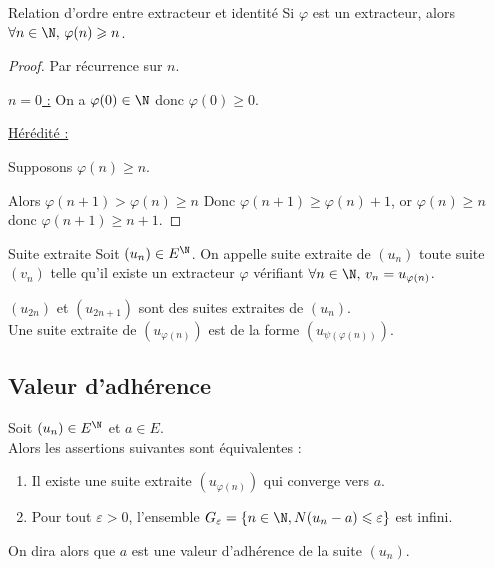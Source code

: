 \begin{proposition}{Relation d'ordre entre extracteur et identité}{}
    Si $\varphi$ est un extracteur, alors $\forall n \in \N, \, \varphi(n) \geqslant n$.
\end{proposition}


\begin{proof}
    Par récurrence sur $n$. 

    \uline{$n = 0$ :}
    On a $\varphi(0) \in \N$ donc $\varphi(0) \geqslant 0$.

    \uline{Hérédité :}

    Supposons $\varphi(n) \geqslant n$.

    Alors $\varphi(n + 1) > \varphi(n) \geqslant n$ 
    Donc $\varphi(n + 1) \geqslant \varphi(n) + 1$, or $\varphi(n) \geqslant n$ donc
    $\varphi(n + 1) \geqslant n + 1$.
\end{proof}

\begin{definition}{Suite extraite}{}
    Soit $(u_n) \in E^{\N}$. On appelle suite extraite de $(u_n)$ toute suite 
    $(v_n)$ telle qu'il existe un extracteur $\varphi$ vérifiant 
    $\forall n \in \N, \, v_n = u_{\varphi(n)}$.
\end{definition}

\begin{exemple}
    $(u_{2n})$ et $(u_{2n + 1})$ sont des suites extraites de $(u_n)$. \\

    Une suite extraite de $(u_{\varphi(n)})$ est de la forme $(u_{\psi (\varphi (n))})$.
\end{exemple}

\subsection{Valeur d'adhérence}

\begin{theoreme}{}{}
    Soit $(u_n) \in E^{\N}$ et $a \in E$. \\

    Alors les assertions suivantes sont équivalentes :
    \begin{enumerate}
        \item Il existe une suite extraite $(u_{\varphi(n)})$ qui converge 
            vers $a$.
        \item Pour tout $\varepsilon > 0$, l'ensemble 
            $G_\varepsilon = \{n \in \N, N(u_n - a) \leqslant \varepsilon\}$ est infini.
    \end{enumerate}

    On dira alors que $a$ est une valeur d'adhérence de la suite $(u_n)$.
\end{theoreme}

